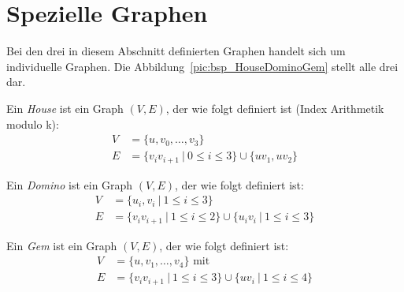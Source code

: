 \section{Spezielle Graphen}
Bei den drei in diesem Abschnitt definierten Graphen handelt sich um individuelle Graphen. Die Abbildung~\ref{pic:bsp_HouseDominoGem} stellt alle drei dar.

\begin{mydef}
    Ein \emph{House} ist ein Graph $(V,E)$, der wie folgt definiert ist (Index Arithmetik modulo k):
    \begin{align*}
        V &=\{u,v_0,\ldots,v_3\} \\
        E &=\{v_iv_{i+1}\ | \ 0 \leq i \leq 3 \} \cup \{uv_1,uv_2\}
    \end{align*}
\end{mydef}

\begin{mydef}
    Ein \emph{Domino} ist ein Graph $(V,E)$, der wie folgt definiert ist:
    \begin{align*}
        V &=\{u_i,v_i \ |\ 1 \leq i \leq 3 \} \\
        E &=\{v_iv_{i+1} \ | \ 1 \leq i \leq 2 \} \cup \{u_iv_i \ | \ 1 \leq i \leq 3 \}
    \end{align*}
\end{mydef}

\begin{mydef}
    Ein \emph{Gem} ist ein Graph $(V,E)$, der wie folgt definiert ist:
    \begin{align*}
        V &=\{u,v_1,\ldots,v_4\} \text{ mit } \\
        E &=\{v_iv_{i+1}\ | \ 1 \leq i \leq 3 \} \cup \{uv_i \ | \ 1 \leq i \leq 4 \}
    \end{align*}
\end{mydef}

